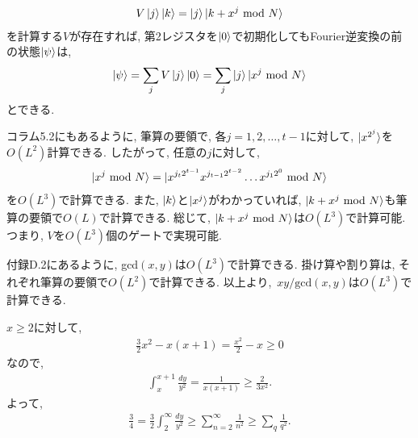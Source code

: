 \begin{ex}
    \label{ex5.14}
    \begin{align*}
        V \ket{j} \ket{k} = \ket{j} \ket{k + x^j \ \mathrm{mod} \ N}
    \end{align*}
    を計算する$V$が存在すれば, 第2レジスタを$\ket{0}$で初期化してもFourier逆変換の前の状態$\ket{\psi}$は,
    \begin{align*}
        \ket{\psi} = \sum_j V \ket{j} \ket{0} = \sum_j \ket{j} \ket{x^j \ \mathrm{mod} \ N}
    \end{align*}
    とできる.
    \par
    コラム5.2にもあるように, 筆算の要領で, 各$j = 1, 2, \dots , t-1$に対して, $\ket{x^{2^j}}$を$O(L^2)$計算できる. したがって, 任意の$j$に対して,
    \begin{align*}
        \ket{x^j \ \mathrm{mod} \ N} =  \ket{ x^{j_t 2^{t-1}} x^{j_{t-1} 2^{t-2}} \dots x^{j_1 2^0} \ \mathrm{mod} \ N}
    \end{align*}
    を$O(L^3)$で計算できる. また, $\ket{k}$と$\ket{x^j}$がわかっていれば, $\ket{k + x^j \ \mathrm{mod} \ N}$も筆算の要領で$O(L)$で計算できる. 総じて, $\ket{k + x^j \ \mathrm{mod} \ N}$は$O(L^3)$で計算可能. つまり, $V$を$O(L^3)$個のゲートで実現可能.
\end{ex}


\begin{ex}
    \label{ex5.15}
    付録D.2にあるように, gcd$(x,y)$は$O(L^3)$で計算できる.
    掛け算や割り算は, それぞれ筆算の要領で$O(L^2)$で計算できる.
    以上より,\ $xy/\mathrm{gcd}(x,y)$は$O(L^3)$で計算できる.
\end{ex}
\begin{ex}
    \label{5.16}
    $x \geq 2$に対して,
    \begin{align*}
        \frac{3}{2} x^2 - x(x+1) = \frac{x^2}{2} - x \geq 0
    \end{align*}
    なので,
    \begin{align*}
        \int_x^{x+1} \frac{dy}{y^2} =\frac{1}{x(x+1)} \geq \frac{2}{3 x^2}.
    \end{align*}
    よって,
    \begin{align*}
        \frac{3}{4} = \frac{3}{2} \int_{2}^{\infty} \frac{dy}{y^2}
        \geq
        \sum_{n=2}^{\infty} \frac{1}{n^2}
        \geq
        \sum_{q} \frac{1}{q^2}.
    \end{align*}
\end{ex}

\begin{ex}
    \label{ex5.17}
\end{ex}

